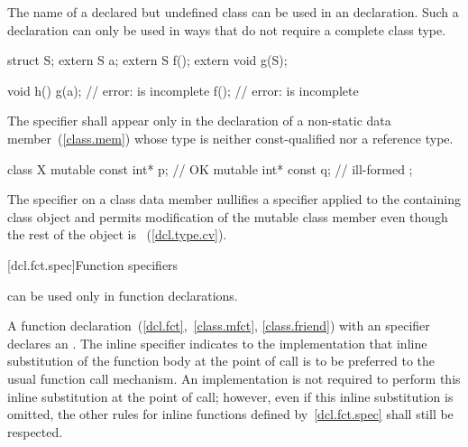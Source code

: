 \pnum
{}%
The name of a declared but undefined class can be used in an
 declaration. Such a declaration can only be used in ways
that do not require a complete class type.
\enterexample

\begin{codeblock}
struct S;
extern S a;
extern S f();
extern void g(S);

void h() {
  g(a);                         // error:  is incomplete
  f();                          // error:  is incomplete
}
\end{codeblock}
\exitexample

\pnum
The  specifier shall appear only in the declaration of
a non-static data member~(\ref{class.mem})
whose type is neither const-qualified nor a reference type.
\enterexample

\begin{codeblock}
class X {
  mutable const int* p;         // OK
  mutable int* const q;         // ill-formed
};
\end{codeblock}
\exitexample

\pnum
The  specifier on a class data member nullifies a
 specifier applied to the containing class object and
permits modification of the mutable class member even though the rest of
the object is ~(\ref{dcl.type.cv}).

[dcl.fct.spec]{Function specifiers}%
%

\pnum
{}
can be used only in function declarations.

\begin{bnf}
\br
    \br
    \br
\end{bnf}

\pnum
{}%
%
A function declaration~(\ref{dcl.fct},~\ref{class.mfct},
\ref{class.friend}) with an  specifier declares an
. The inline specifier indicates to
the implementation that inline substitution of the function body at the
point of call is to be preferred to the usual function call mechanism.
An implementation is not required to perform this inline substitution at
the point of call; however, even if this inline substitution is omitted,
the other rules for inline functions defined by~\ref{dcl.fct.spec} shall
still be respected.

